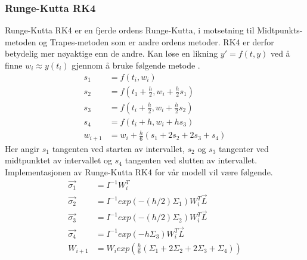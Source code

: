 \subsubsection{Runge-Kutta RK4}
Runge-Kutta RK4 er en fjerde ordens Runge-Kutta, i motsetning til Midtpunkts-metoden og Trapes-metoden som er andre ordens metoder. RK4 er derfor betydelig mer nøyaktige enn de andre. \newline\newline
Kan løse en likning $y' = f(t, y)$ ved å finne $w_i \approx y(t_i)$ gjennom å bruke følgende metode \cite{MATEMATIKK:1}. 
\begin{equation}
\begin{aligned}
    s_1&=f(t_i, w_i)\\
    s_2&=f(t_1+\frac{h}{2}, w_i + \frac{h}{2}s_1)\\
    s_3&=f(t_i+\frac{h}{2}, w_i+\frac{h}{2}s_2)\\
    s_4&=f(t_i+h, w_i+hs_3)\\
    w_{i+1}&=w_i+\frac{h}{6}(s_1+2s_2+2s_3+s_4)
\end{aligned}
\end{equation}
Her angir $s_1$ tangenten ved starten av intervallet, $s_2$ og $s_3$ tangenter ved midtpunktet av intervallet og $s_4$ tangenten ved slutten av intervallet.\newline\newline
Implementasjonen av Runge-Kutta RK4 for vår modell vil være følgende.
\begin{equation}
\begin{aligned}
    \Vec{\sigma_1}&=I^{-1}W^T_i\\
    \Vec{\sigma_2}&=I^{-1}exp(-(h/2)\Sigma_1)W^T_i\Vec{L}\\
    \Vec{\sigma_3}&=I^{-1}exp(-(h/2)\Sigma_2)W^T_i\Vec{L}\\
    \Vec{\sigma_4}&=I^{-1}exp(-h\Sigma_3)W^T_i\Vec{L}\\
    W_{i+1}&=W_iexp(\frac{h}{6}(\Sigma_1+2\Sigma_2+2\Sigma_3+\Sigma_4))
\end{aligned}
\end{equation}

